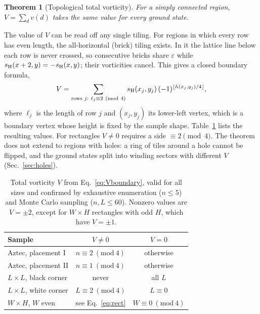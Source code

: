 \documentclass[aps,prb,twocolumn,floatfix,longbibliography]{revtex4-2}
\newtheorem{theorem}{Theorem}
\newcommand{\eps}{\varepsilon}
\newcommand{\floor}[1]{\lfloor #1\rfloor}
\begin{document}
\begin{theorem}[Topological total vorticity]
For a simply connected region, $V=\sum_d v(d)$ takes the same value for every ground state.
\end{theorem}

The value of $V$ can be read off any single tiling. For regions in which every row has even length, the all-horizontal (brick) tiling exists. In it the lattice line below each row is never crossed, so consecutive bricks share $\eps$ while $s_{\rm H}(x+2,y)=-s_{\rm H}(x,y)$; their vorticities cancel. This gives a closed boundary formula,
\begin{equation}
V=\sum_{\text{rows }j:\ \ell_j\equiv2\ (\mathrm{mod}\ 4)} s_{\rm H}(x_j,y_j)\,(-1)^{\floor{h(x_j,y_j)/4}},
\label{eq:Vboundary}
\end{equation}
where $\ell_j$ is the length of row $j$ and $(x_j,y_j)$ its lower-left vertex, which is a boundary vertex whose height is fixed by the sample shape. Table~\ref{tab:V} lists the resulting values. For rectangles $V\neq0$ requires a side $\equiv2\pmod4$. The theorem does not extend to regions with holes: a ring of tiles around a hole cannot be flipped, and the ground states split into winding sectors with different $V$ (Sec.~\ref{sec:holes}).

\begin{table}[b]
\caption{Total vorticity $V$ from Eq.~\eqref{eq:Vboundary}, valid for all sizes and confirmed by exhaustive enumeration ($n\le5$) and Monte Carlo sampling ($n,L\le60$). Nonzero values are $V=\pm2$, except for $W\times H$ rectangles with odd $H$, which have $V=\pm1$.}
\label{tab:V}
\begin{ruledtabular}
\begin{tabular}{lcc}
Sample & $V\neq0$ & $V=0$\\
\hline
Aztec, placement I & $n\equiv2\ (\mathrm{mod}\ 4)$ & otherwise\\
Aztec, placement II & $n\equiv1\ (\mathrm{mod}\ 4)$ & otherwise\\
$L\times L$, black corner & never & all $L$\\
$L\times L$, white corner & $L\equiv2\ (\mathrm{mod}\ 4)$ & $L\equiv0$\\
$W\times H$, $W$ even & see Eq.~\eqref{eq:rect} & $W\equiv0\ (\mathrm{mod}\ 4)$\\
\end{tabular}
\end{ruledtabular}
\end{table}
\end{document}

